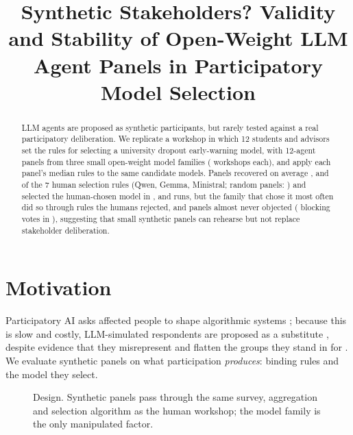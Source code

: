 \documentclass[11pt,a4paper]{article}
\title[Synthetic Stakeholders?]{Synthetic Stakeholders? Validity and Stability of Open-Weight LLM Agent Panels in Participatory Model Selection}
\begin{document}
\maketitle

\begin{abstract}
LLM agents are proposed as synthetic participants, but rarely tested against a real participatory deliberation.
We replicate a workshop in which 12 students and advisors set the rules for selecting a university dropout early-warning model, with 12-agent panels from three small open-weight model families (\nRuns{} workshops each), and apply each panel's median rules to the same candidate models.
Panels recovered on average ,  and  of the 7 human selection rules (Qwen, Gemma, Ministral; random panels: \chanceRules{}) and selected the human-chosen model in \decisionQwen{}, \decisionGemma{} and \decisionMinistral{} runs, but the family that chose it most often did so through rules the humans rejected, and panels almost never objected (\blockCards{} blocking votes in \nCards{}), suggesting that small synthetic panels can rehearse but not replace stakeholder deliberation.
\end{abstract}

\section{Motivation}
Participatory AI asks affected people to shape algorithmic systems \citep{birhanePowerPeopleOpportunities2022,delgadoParticipatoryTurnAI2023}; because this is slow and costly, LLM-simulated respondents are proposed as a substitute \citep{argyle2023outofone,aher2023using}, despite evidence that they misrepresent and flatten the groups they stand in for \citep{santurkar2023whose,wang2025misportray}.
We evaluate synthetic panels on what participation \emph{produces}: binding rules and the model they select.

\begin{figure}[b]
  \centering
  
  \caption{Design. Synthetic panels pass through the same survey, aggregation and selection algorithm as the human workshop; the model family is the only manipulated factor.}
  \label{fig:design}
\end{figure}
\end{document}
